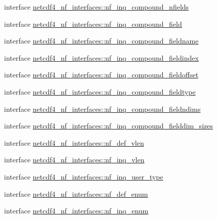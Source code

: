 \begin{DoxyCompactItemize}
interface \hyperlink{interfacenetcdf4__nf__interfaces_1_1nf__inq__compound__nfields}{netcdf4\+\_\+nf\+\_\+interfaces\+::nf\+\_\+inq\+\_\+compound\+\_\+nfields}
\item 
interface \hyperlink{interfacenetcdf4__nf__interfaces_1_1nf__inq__compound__field}{netcdf4\+\_\+nf\+\_\+interfaces\+::nf\+\_\+inq\+\_\+compound\+\_\+field}
\item 
interface \hyperlink{interfacenetcdf4__nf__interfaces_1_1nf__inq__compound__fieldname}{netcdf4\+\_\+nf\+\_\+interfaces\+::nf\+\_\+inq\+\_\+compound\+\_\+fieldname}
\item 
interface \hyperlink{interfacenetcdf4__nf__interfaces_1_1nf__inq__compound__fieldindex}{netcdf4\+\_\+nf\+\_\+interfaces\+::nf\+\_\+inq\+\_\+compound\+\_\+fieldindex}
\item 
interface \hyperlink{interfacenetcdf4__nf__interfaces_1_1nf__inq__compound__fieldoffset}{netcdf4\+\_\+nf\+\_\+interfaces\+::nf\+\_\+inq\+\_\+compound\+\_\+fieldoffset}
\item 
interface \hyperlink{interfacenetcdf4__nf__interfaces_1_1nf__inq__compound__fieldtype}{netcdf4\+\_\+nf\+\_\+interfaces\+::nf\+\_\+inq\+\_\+compound\+\_\+fieldtype}
\item 
interface \hyperlink{interfacenetcdf4__nf__interfaces_1_1nf__inq__compound__fieldndims}{netcdf4\+\_\+nf\+\_\+interfaces\+::nf\+\_\+inq\+\_\+compound\+\_\+fieldndims}
\item 
interface \hyperlink{interfacenetcdf4__nf__interfaces_1_1nf__inq__compound__fielddim__sizes}{netcdf4\+\_\+nf\+\_\+interfaces\+::nf\+\_\+inq\+\_\+compound\+\_\+fielddim\+\_\+sizes}
\item 
interface \hyperlink{interfacenetcdf4__nf__interfaces_1_1nf__def__vlen}{netcdf4\+\_\+nf\+\_\+interfaces\+::nf\+\_\+def\+\_\+vlen}
\item 
interface \hyperlink{interfacenetcdf4__nf__interfaces_1_1nf__inq__vlen}{netcdf4\+\_\+nf\+\_\+interfaces\+::nf\+\_\+inq\+\_\+vlen}
\item 
interface \hyperlink{interfacenetcdf4__nf__interfaces_1_1nf__inq__user__type}{netcdf4\+\_\+nf\+\_\+interfaces\+::nf\+\_\+inq\+\_\+user\+\_\+type}
\item 
interface \hyperlink{interfacenetcdf4__nf__interfaces_1_1nf__def__enum}{netcdf4\+\_\+nf\+\_\+interfaces\+::nf\+\_\+def\+\_\+enum}
\item 
interface \hyperlink{interfacenetcdf4__nf__interfaces_1_1nf__inq__enum}{netcdf4\+\_\+nf\+\_\+interfaces\+::nf\+\_\+inq\+\_\+enum}
\item 

\end{DoxyCompactItemize}

